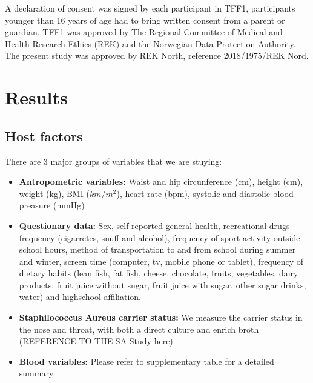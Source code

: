 \documentclass[10pt, a4paper, onecolumn]{article} %
\begin{document}
A declaration of consent was signed by each participant in TFF1, participants younger than 16 years of age had to bring written consent from a parent or guardian. TFF1 was approved by The Regional Committee of Medical and Health Research Ethics (REK) and the Norwegian Data Protection Authority. The present study was approved by REK North, reference 2018/1975/REK Nord. \\


\section{Results}

\subsection{Host factors}

There are 3 major groups of variables that we are stuying:\\

\begin{itemize}

  \item \textbf{Antropometric variables:} Waist and hip circunference (cm), height (cm), weight (kg), BMI ($km/m^{2}$), heart rate (bpm), systolic and diastolic blood preasure (mmHg) \\
  
  \item\textbf{ Questionary data:} Sex, self reported general health, recreational drugs frequency (cigarretes, snuff and alcohol), frequency of sport activity outside school hours, method of transportation to and from school during summer and winter, screen time (computer, tv, mobile phone or tablet), frequency of dietary habits (lean fish, fat fish, cheese, chocolate, fruits, vegetables, dairy products, fruit juice without sugar, fruit juice with sugar, other sugar drinks, water) and highschool affiliation.

  \item\textbf{ Staphilococcus Aureus carrier status:} We measure the carrier status in the nose and throat, with both a direct culture and enrich broth (REFERENCE TO THE SA Study here)\\
    
  \item \textbf{Blood variables:} Please refer to supplementary table for a detailed summary\\
  
\end{itemize}
\end{document}
